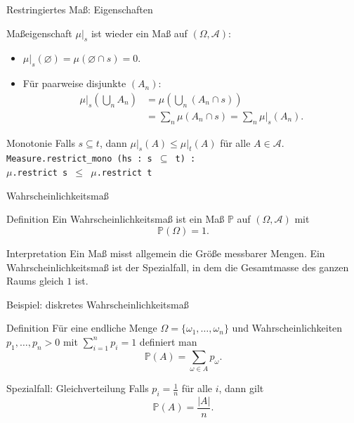 \documentclass{beamer}
\begin{document}
\begin{frame}{Restringiertes Maß: Eigenschaften}
\begin{block}{Maßeigenschaft}
\(\mu\vert_s\) ist wieder ein Maß auf \((\Omega,\mathcal A)\):
\begin{itemize}
    \item \(\mu\vert_s(\varnothing)=\mu(\varnothing\cap s)=0\).
    \item Für paarweise disjunkte \((A_n)\):
    \begin{align*}
    \mu\vert_s\!\left(\bigcup_n A_n\right)
    &=\mu\!\left(\bigcup_n (A_n\cap s)\right)\\
    &=\sum_n \mu(A_n\cap s)
    =\sum_n \mu\vert_s(A_n).
    \end{align*}
\end{itemize}
\end{block}

\begin{block}{Monotonie}
Falls \(s\subseteq t\), dann \(\mu\vert_s(A)\le\mu\vert_t(A)\) für alle \(A\in\mathcal A\).
\\[4pt]
{\small\texttt{Measure.restrict\_mono (hs : s \(\subseteq\) t) :}}\\
{\small\texttt{\quad \(\mu\).restrict s \(\le\) \(\mu\).restrict t}}
\end{block}
\end{frame}

\begin{frame}{Wahrscheinlichkeitsmaß}
\begin{block}{Definition}
Ein Wahrscheinlichkeitsmaß ist ein Maß \(\mathbb P\) auf \((\Omega,\mathcal A)\) mit
\[
\mathbb P(\Omega)=1.
\]
\end{block}

\begin{block}{Interpretation}
Ein Maß misst allgemein die Größe messbarer Mengen.
Ein Wahrscheinlichkeitsmaß ist der Spezialfall, in dem die Gesamtmasse des ganzen Raums gleich \(1\) ist.
\end{block}
\end{frame}


\begin{frame}{Beispiel: diskretes Wahrscheinlichkeitsmaß}
\begin{block}{Definition}
Für eine endliche Menge \(\Omega=\{\omega_1,\ldots,\omega_n\}\) und Wahrscheinlichkeiten
\(p_1,\ldots,p_n>0\) mit \(\sum_{i=1}^n p_i=1\) definiert man
\[
\mathbb P(A)=\sum_{\omega\in A} p_\omega.
\]
\end{block}

\begin{block}{Spezialfall: Gleichverteilung}
Falls \(p_i=\frac1n\) für alle \(i\), dann gilt
\[
\mathbb P(A)=\frac{|A|}{n}.
\]
\end{block}
\end{frame}
\end{document}
